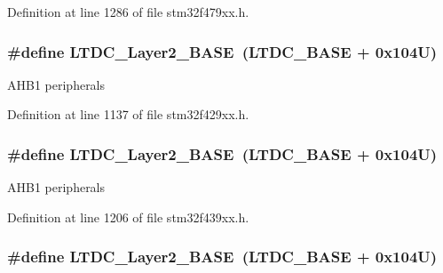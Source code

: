 Definition at line 1286 of file stm32f479xx.\+h.

\subsubsection[{\texorpdfstring{L\+T\+D\+C\+\_\+\+Layer2\+\_\+\+B\+A\+SE}{LTDC_Layer2_BASE}}]{\setlength{\rightskip}{0pt plus 5cm}\#define L\+T\+D\+C\+\_\+\+Layer2\+\_\+\+B\+A\+SE~({\bf L\+T\+D\+C\+\_\+\+B\+A\+SE} + 0x104\+U)}\hypertarget{group___peripheral__memory__map_ga696614b764a3820d9f9560a0eec1e111}{}\label{group___peripheral__memory__map_ga696614b764a3820d9f9560a0eec1e111}
A\+H\+B1 peripherals 

Definition at line 1137 of file stm32f429xx.\+h.

\subsubsection[{\texorpdfstring{L\+T\+D\+C\+\_\+\+Layer2\+\_\+\+B\+A\+SE}{LTDC_Layer2_BASE}}]{\setlength{\rightskip}{0pt plus 5cm}\#define L\+T\+D\+C\+\_\+\+Layer2\+\_\+\+B\+A\+SE~({\bf L\+T\+D\+C\+\_\+\+B\+A\+SE} + 0x104\+U)}\hypertarget{group___peripheral__memory__map_ga696614b764a3820d9f9560a0eec1e111}{}\label{group___peripheral__memory__map_ga696614b764a3820d9f9560a0eec1e111}
A\+H\+B1 peripherals 

Definition at line 1206 of file stm32f439xx.\+h.

\subsubsection[{\texorpdfstring{L\+T\+D\+C\+\_\+\+Layer2\+\_\+\+B\+A\+SE}{LTDC_Layer2_BASE}}]{\setlength{\rightskip}{0pt plus 5cm}\#define L\+T\+D\+C\+\_\+\+Layer2\+\_\+\+B\+A\+SE~({\bf L\+T\+D\+C\+\_\+\+B\+A\+SE} + 0x104\+U)}\hypertarget{group___peripheral__memory__map_ga696614b764a3820d9f9560a0eec1e111}{}\label{group___peripheral__memory__map_ga696614b764a3820d9f9560a0eec1e111}


